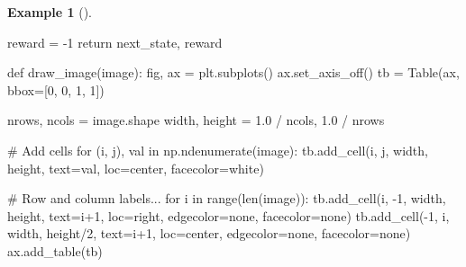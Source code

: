 \documentclass[
  letterpaper,
]{krantz}
\makeatletter
\newenvironment{Shaded}{\begin{snugshade}}{\end{snugshade}}
\newcommand{\BuiltInTok}[1]{\textcolor[rgb]{0.00,0.23,0.31}{#1}}
\newcommand{\CommentTok}[1]{\textcolor[rgb]{0.37,0.37,0.37}{#1}}
\newcommand{\ControlFlowTok}[1]{\textcolor[rgb]{0.00,0.23,0.31}{#1}}
\newcommand{\DecValTok}[1]{\textcolor[rgb]{0.68,0.00,0.00}{#1}}
\newcommand{\FloatTok}[1]{\textcolor[rgb]{0.68,0.00,0.00}{#1}}
\newcommand{\KeywordTok}[1]{\textcolor[rgb]{0.00,0.23,0.31}{#1}}
\newcommand{\NormalTok}[1]{\textcolor[rgb]{0.00,0.23,0.31}{#1}}
\newcommand{\OperatorTok}[1]{\textcolor[rgb]{0.37,0.37,0.37}{#1}}
\newcommand{\StringTok}[1]{\textcolor[rgb]{0.13,0.47,0.30}{#1}}
\newenvironment{kframe}{%
\medskip{}
\setlength{\fboxsep}{.8em}
 \def\at@end@of@kframe{}%
 \ifinner\ifhmode%
  \def\at@end@of@kframe{\end{minipage}}%
  \begin{minipage}{\columnwidth}%
 \fi\fi%
 \def\FrameCommand##1{\hskip\@totalleftmargin \hskip-\fboxsep
 \colorbox{shadecolor}{##1}\hskip-\fboxsep
     \hskip-\linewidth \hskip-\@totalleftmargin \hskip\columnwidth}%
 \MakeFramed {\advance\hsize-\width
   \@totalleftmargin\z@ \linewidth\hsize
   \@setminipage}}%
 {\par\unskip\endMakeFramed%
 \at@end@of@kframe}
\renewenvironment{Shaded}{\begin{kframe}}{\end{kframe}}
\theoremstyle{plain}
\theoremstyle{definition}
\newtheorem{example}{Example}[chapter]
\theoremstyle{definition}
\theoremstyle{remark}
\makeatother
\begin{document}
\begin{example}[]
\begin{tcolorbox}[enhanced jigsaw, bottomrule=.15mm, opacityback=0, breakable, colframe=quarto-callout-tip-color-frame, left=2mm, rightrule=.15mm, toprule=.15mm, leftrule=.75mm, arc=.35mm, colback=white]
\begin{codelisting}[H]
\begin{Shaded}
\begin{Highlighting}[]
\NormalTok{    reward }\OperatorTok{=} \OperatorTok{{-}}\DecValTok{1}
    \ControlFlowTok{return}\NormalTok{ next\_state, reward}


\KeywordTok{def}\NormalTok{ draw\_image(image):}
\NormalTok{    fig, ax }\OperatorTok{=}\NormalTok{ plt.subplots()}
\NormalTok{    ax.set\_axis\_off()}
\NormalTok{    tb }\OperatorTok{=}\NormalTok{ Table(ax, bbox}\OperatorTok{=}\NormalTok{[}\DecValTok{0}\NormalTok{, }\DecValTok{0}\NormalTok{, }\DecValTok{1}\NormalTok{, }\DecValTok{1}\NormalTok{])}

\NormalTok{    nrows, ncols }\OperatorTok{=}\NormalTok{ image.shape}
\NormalTok{    width, height }\OperatorTok{=} \FloatTok{1.0} \OperatorTok{/}\NormalTok{ ncols, }\FloatTok{1.0} \OperatorTok{/}\NormalTok{ nrows}

    \CommentTok{\# Add cells}
    \ControlFlowTok{for}\NormalTok{ (i, j), val }\KeywordTok{in}\NormalTok{ np.ndenumerate(image):}
\NormalTok{        tb.add\_cell(i, j, width, height, text}\OperatorTok{=}\NormalTok{val,}
\NormalTok{                    loc}\OperatorTok{=}\StringTok{\textquotesingle{}center\textquotesingle{}}\NormalTok{, facecolor}\OperatorTok{=}\StringTok{\textquotesingle{}white\textquotesingle{}}\NormalTok{)}

        \CommentTok{\# Row and column labels...}
    \ControlFlowTok{for}\NormalTok{ i }\KeywordTok{in} \BuiltInTok{range}\NormalTok{(}\BuiltInTok{len}\NormalTok{(image)):}
\NormalTok{        tb.add\_cell(i, }\OperatorTok{{-}}\DecValTok{1}\NormalTok{, width, height, text}\OperatorTok{=}\NormalTok{i}\OperatorTok{+}\DecValTok{1}\NormalTok{, loc}\OperatorTok{=}\StringTok{\textquotesingle{}right\textquotesingle{}}\NormalTok{,}
\NormalTok{                    edgecolor}\OperatorTok{=}\StringTok{\textquotesingle{}none\textquotesingle{}}\NormalTok{, facecolor}\OperatorTok{=}\StringTok{\textquotesingle{}none\textquotesingle{}}\NormalTok{)}
\NormalTok{        tb.add\_cell(}\OperatorTok{{-}}\DecValTok{1}\NormalTok{, i, width, height}\OperatorTok{/}\DecValTok{2}\NormalTok{, text}\OperatorTok{=}\NormalTok{i}\OperatorTok{+}\DecValTok{1}\NormalTok{, loc}\OperatorTok{=}\StringTok{\textquotesingle{}center\textquotesingle{}}\NormalTok{,}
\NormalTok{                    edgecolor}\OperatorTok{=}\StringTok{\textquotesingle{}none\textquotesingle{}}\NormalTok{, facecolor}\OperatorTok{=}\StringTok{\textquotesingle{}none\textquotesingle{}}\NormalTok{)}
\NormalTok{    ax.add\_table(tb)}



\end{Highlighting}
\end{Shaded}
\end{codelisting}
\end{tcolorbox}
\end{example}
\end{document}
